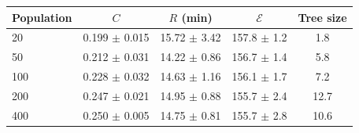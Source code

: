 \begin{tabular}{lcccc}\toprule
Population & $C$ & $R$ (min) & $\mathcal{E}$ & Tree size\\\midrule
20 & 0.199 $\pm$ 0.015 & 15.72 $\pm$ 3.42 & 157.8 $\pm$ 1.2 & 1.8\\
50 & 0.212 $\pm$ 0.031 & 14.22 $\pm$ 0.86 & 156.7 $\pm$ 1.4 & 5.8\\
100 & 0.228 $\pm$ 0.032 & 14.63 $\pm$ 1.16 & 156.1 $\pm$ 1.7 & 7.2\\
200 & 0.247 $\pm$ 0.021 & 14.95 $\pm$ 0.88 & 155.7 $\pm$ 2.4 & 12.7\\
400 & 0.250 $\pm$ 0.005 & 14.75 $\pm$ 0.81 & 155.7 $\pm$ 2.8 & 10.6\\
\bottomrule
\end{tabular}